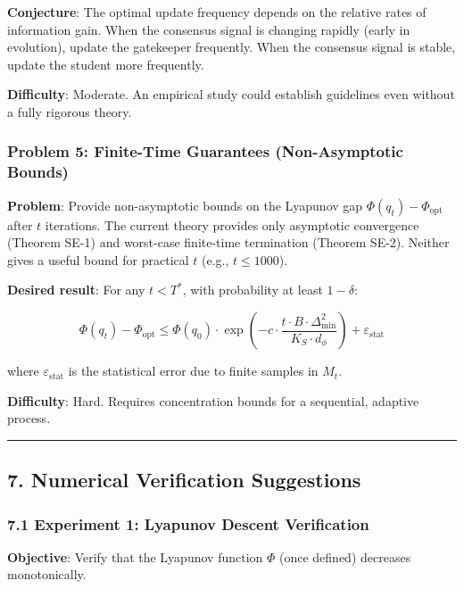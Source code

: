 \documentclass[
  12pt,
]{article}
\begin{document}
\textbf{Conjecture}: The optimal update frequency depends on the
relative rates of information gain. When the consensus signal is
changing rapidly (early in evolution), update the gatekeeper frequently.
When the consensus signal is stable, update the student more frequently.

\textbf{Difficulty}: Moderate. An empirical study could establish
guidelines even without a fully rigorous theory.

\subsubsection{Problem 5: Finite-Time Guarantees (Non-Asymptotic
Bounds)}\label{problem-5-finite-time-guarantees-non-asymptotic-bounds}

\textbf{Problem}: Provide non-asymptotic bounds on the Lyapunov gap
\(\Phi(q_t) - \Phi_{\text{opt}}\) after \(t\) iterations. The current
theory provides only asymptotic convergence (Theorem SE-1) and
worst-case finite-time termination (Theorem SE-2). Neither gives a
useful bound for practical \(t\) (e.g., \(t \leq 1000\)).

\textbf{Desired result}: For any \(t < T^*\), with probability at least
\(1-\delta\):

\[\Phi(q_t) - \Phi_{\text{opt}} \leq \Phi(q_0) \cdot \exp\left(-c \cdot \frac{t \cdot B \cdot \Delta_{\min}^2}{K_S \cdot d_\phi}\right) + \varepsilon_{\text{stat}}\]

where \(\varepsilon_{\text{stat}}\) is the statistical error due to
finite samples in \(M_t\).

\textbf{Difficulty}: Hard. Requires concentration bounds for a
sequential, adaptive process.

\begin{center}\rule{0.5\linewidth}{0.5pt}\end{center}

\subsection{7. Numerical Verification
Suggestions}\label{numerical-verification-suggestions}

\subsubsection{7.1 Experiment 1: Lyapunov Descent
Verification}\label{experiment-1-lyapunov-descent-verification}

\textbf{Objective}: Verify that the Lyapunov function \(\Phi\) (once
defined) decreases monotonically.
\end{document}
